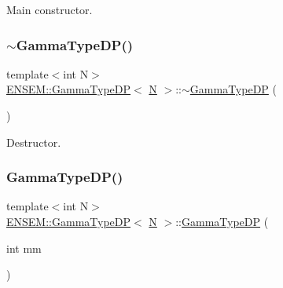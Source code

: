 Main constructor. 

\mbox{\label{classENSEM_1_1GammaTypeDP_ad0e6f055b87687dac9b7b95e6ec808b0}} 
\subsubsection{\texorpdfstring{$\sim$GammaTypeDP()}{~GammaTypeDP()}\hspace{0.1cm}{\footnotesize\ttfamily [2/3]}}
{\footnotesize\ttfamily template$<$int N$>$ \\
\mbox{\hyperlink{classENSEM_1_1GammaTypeDP}{E\+N\+S\+E\+M\+::\+Gamma\+Type\+DP}}$<$ \mbox{\hyperlink{adat__devel_2lib_2hadron_2operator__name__util_8cc_a7722c8ecbb62d99aee7ce68b1752f337}{N}} $>$\+::$\sim$\mbox{\hyperlink{classENSEM_1_1GammaTypeDP}{Gamma\+Type\+DP}} (\begin{DoxyParamCaption}{ }\end{DoxyParamCaption})\hspace{0.3cm}{\ttfamily [inline]}}



Destructor. 

\mbox{\label{classENSEM_1_1GammaTypeDP_a6a31946a6e7bde24f7bae87f6cfd2add}} 
\subsubsection{\texorpdfstring{GammaTypeDP()}{GammaTypeDP()}\hspace{0.1cm}{\footnotesize\ttfamily [4/6]}}
{\footnotesize\ttfamily template$<$int N$>$ \\
\mbox{\hyperlink{classENSEM_1_1GammaTypeDP}{E\+N\+S\+E\+M\+::\+Gamma\+Type\+DP}}$<$ \mbox{\hyperlink{adat__devel_2lib_2hadron_2operator__name__util_8cc_a7722c8ecbb62d99aee7ce68b1752f337}{N}} $>$\+::\mbox{\hyperlink{classENSEM_1_1GammaTypeDP}{Gamma\+Type\+DP}} (\begin{DoxyParamCaption}\item[{int}]{mm }\end{DoxyParamCaption})\hspace{0.3cm}{\ttfamily [inline]}}



